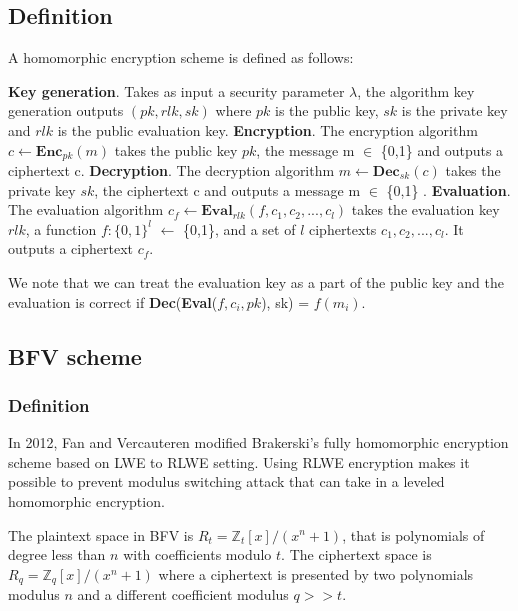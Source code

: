 \documentclass[A4paper,12pt]{article}
\begin{document}
\subsection{Definition}
\begin{definition} A homomorphic encryption scheme is defined as follows:
\end{definition}
	\textbf{Key generation}. Takes as input a security parameter $\lambda$, the algorithm key generation outputs $(pk, rlk, sk) $ where $pk$ is the public key, $sk$ is the private key and $rlk$ is the public evaluation key. \newline
	\textbf{Encryption}. The encryption algorithm $c \leftarrow \textbf{Enc}_{pk}{(m)}$ takes the public key $pk$, the message m $\in$ \{0,1\} and outputs a ciphertext c. \newline
	\textbf{Decryption}. The decryption algorithm $m \leftarrow \textbf{Dec}_{sk}(c)$ takes the private key $sk$, the ciphertext c and outputs a message m $\in$ \{0,1\} . \newline
	\textbf{Evaluation}. The evaluation algorithm $c_f \leftarrow \textbf{Eval}_{rlk}(f, c_1, c_2,..., c_l) $ takes the evaluation key $rlk$, a function $f: \{0,1\}^l$ $\leftarrow$ \{0,1\}, and a set of $l$ ciphertexts $c_1, c_2,..., c_l$. It outputs a ciphertext $c_f$. \newline
	
We note that we can treat the evaluation key as a part of the public key and the evaluation is correct if \textbf{Dec}(\textbf{Eval}($f, c_i, pk$), sk) = $f(m_i)$.





\subsection{BFV scheme}
	\subsubsection{Definition}
In 2012, Fan and Vercauteren \cite{SHE} modified Brakerski's \cite{brakerskiFHE} fully homomorphic encryption scheme based on LWE to RLWE setting. Using RLWE encryption makes it possible to prevent modulus switching attack that can take in a leveled homomorphic encryption.

The plaintext space in BFV is $R_t = \mathbb{Z}_t[x]/(x^n + 1)$, that is polynomials of degree less than $n$ with coefficients modulo $t$. The ciphertext space is $R_q = \mathbb{Z}_q[x]/(x^n + 1)$ where a ciphertext is presented by two polynomials modulus $n$ and a different coefficient modulus $q >> t$.
\end{document}
